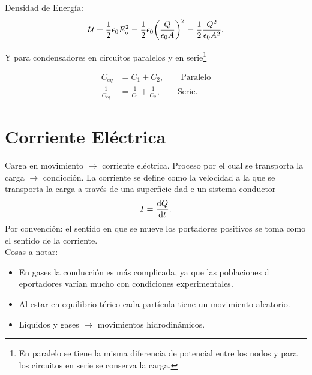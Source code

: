 Densidad de Energía:
\begin{equation}
	\mathcal{U} = \frac{1}{2} \epsilon_0 E_o ^2 = \frac{1}{2} \epsilon_0 \qty(\frac{Q}{\epsilon_0 A})^2 = \frac{1}{2} \frac{Q^2}{\epsilon_0 A^2}.
\end{equation}

Y para condensadores en circuitos paralelos y en serie\footnote{En paralelo se tiene la misma diferencia de potencial entre los nodos y para los circuitos en serie se conserva la carga.}

\begin{align*}
	C_{eq} &= C_1 + C_2, \qquad \text{Paralelo} \\
	\frac{1}{C_{eq}} &= \frac{1}{C_1} + \frac{1}{C_2}, \qquad \text{Serie.}
\end{align*}



\chapter{Corriente Eléctrica}
Carga en movimiento $\to$ corriente eléctrica. Proceso por el cual se transporta la carga $\to$ condicción. La corriente se define como la velocidad a la que se transporta la carga a través de una superficie dad e un sistema conductor
\begin{equation}
	I = \dv{Q}{t}.
\end{equation}
Por convención: el sentido en que se mueve los portadores positivos se toma como el sentido de la corriente. \\

Cosas a notar:
\begin{itemize}
	\item En gases la conducción es más complicada, ya que las poblaciones d eportadores varían mucho con condiciones experimentales.
	\item Al estar en equilibrio térico cada partícula tiene un movimiento aleatorio.
	\item Líquidos y gases $\to$ movimientos hidrodinámicos.
\end{itemize}

